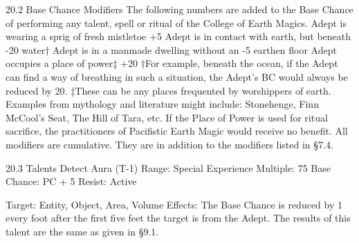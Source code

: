 \documentclass[a4paper]{article}
\begin{document}
\begin{multicols}{3}
20.2 Base Chance Modifiers
The following numbers are added to the Base
Chance of performing any talent, spell or ritual of
the College of Earth Magics.
Adept is wearing a sprig of fresh mistletoe
+5
Adept is in contact with earth, but beneath
-20
water†
Adept is in a manmade dwelling without an
-5
earthen floor
Adept occupies a place of power‡
+20
†For example, beneath the ocean, if the Adept can
find a way of breathing in such a situation, the
Adept’s BC would always be reduced by 20.
‡These can be any places frequented by worshippers of earth. Examples from mythology and literature might include: Stonehenge, Finn McCool’s
Seat, The Hill of Tara, etc. If the Place of Power is
used for ritual sacrifice, the practitioners of Pacifistic Earth Magic would receive no benefit.
All modifiers are cumulative. They are in addition
to the modifiers listed in §7.4.

20.3 Talents
Detect Aura (T-1)
Range: Special
Experience Multiple: 75
Base Chance: PC + 5%
Resist: Active

Target: Entity, Object, Area, Volume
Effects: The Base Chance is reduced by 1%
every foot after the first five feet the target is from
the Adept. The results of this talent are the same as
given in §9.1.


\end{multicols}
\end{document}
